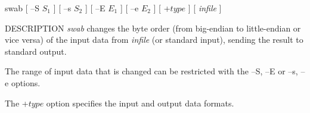 % 
% 
% 
% 
%                                                                        
%
\hypertarget{swab}{}

\begin{synopsis}
\item [swab] [ --S $S_1$ ] [ --s $S_2$ ] [ --E $E_1$ ] [ --e $E_2$ ] 
 	    [ +$type$ ] [ {\em infile} ] 
\end{synopsis}

\begin{qsection}{DESCRIPTION}
{\em swab} changes the byte order 
(from big-endian to little-endian or vice versa) 
of the input data from {\em infile} (or standard input), 
sending the result to standard output.

The range of input data that is changed can be restricted 
with the --S, --E or --s, --e options.

The +$type$ option specifies the input and output data formats.
\end{qsection}

